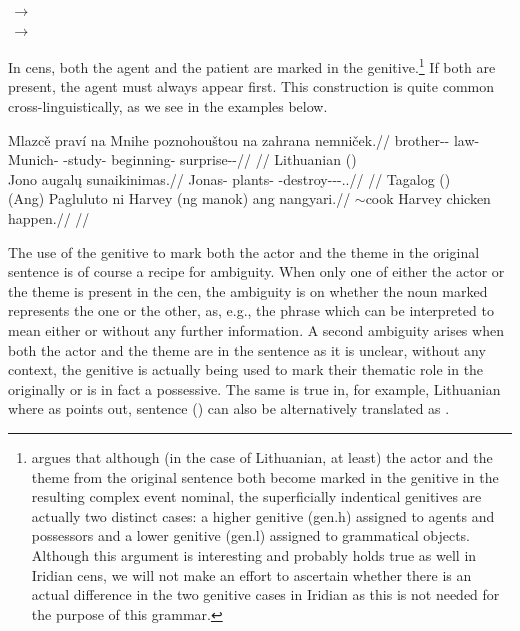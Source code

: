 \pex
    \a {}\,$\rightarrow$\,\\
    \a {}\,$\rightarrow$\,\\
\xe

In {\sc cen}s, both the agent and the patient are marked in the genitive.\footnote{\textcite{serekaite2020} argues that although (in the case of Lithuanian, at least) the actor and the theme from the original sentence both become marked in the genitive in the resulting complex event nominal, the superficially indentical genitives are actually two distinct cases: a higher genitive ({\sc gen.h}) assigned to agents and possessors and a lower genitive ({\sc gen.l}) assigned to grammatical objects. Although this argument is interesting and probably holds true as well in Iridian {\sc cen}s, we will not make an effort to ascertain whether there is an actual difference in the two genitive cases in Iridian as this is not needed for the purpose of this grammar.} If both are present, the agent must always appear first. This construction is quite common cross-linguistically, as we see in the examples below.

\pex
\a\begingl
    \gla Mlazcě praví na Mnihe poznohouštou na zahrana nemniček.//
    \glb brother-\Dim{}-\Gen{} law-\Gen{} \Loc{} Munich-\Acc{} \Ger{}-study-\Nz{} \Loc{} beginning-\Acc{} surprise-\Av{}-\Pf{}//
    \glft {}//
\endgl
\a Lithuanian (\cite[1]{serekaite2020})\\
\begingl
    \gla Jono augal\k{u} sunaikinimas.//
    \glb Jonas-\Gen{} plants-\Gen{} \Pfv{}-destroy-\Caus{}-\Nz-\Nom{}.\M{}.\Sg{}//
    \glft {}//
\endgl
\a Tagalog (\cite[22]{hsieh2019})\\
\begingl
    \gla (Ang) Pagluluto ni Harvey (ng manok) ang nangyari.//
    \glb \Nom{} \Ger{}$\sim$cook \Gen{} Harvey \Gen{} chicken \Nom{} happen.\Pfv{}//
    \glft {}//
\endgl
\xe

The use of the genitive to mark both the actor and the theme in the original sentence is of course a recipe for ambiguity. When only one of either the actor or the theme is present in the {\sc cen}, the ambiguity is on whether the noun marked represents the one or the other, as, e.g., the phrase  which can be interpreted to mean either  or  without any further information. A second ambiguity arises when both the actor and the theme are in the sentence as it is unclear, without any context, the genitive is actually being used to mark their thematic role in the originally or is in fact a possessive. The same is true in, for example, Lithuanian where as \textcite{serekaite2020} points out, sentence () can also be alternatively translated as .

